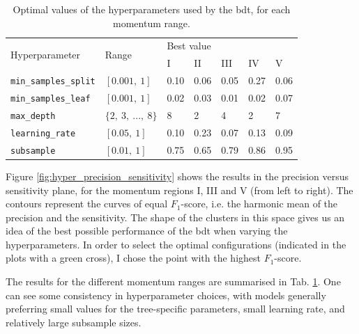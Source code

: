 \begin{table}[t]
	\caption{Optimal values of the hyperparameters used by the \gls{bdt}, for each momentum range.}
	\begin{center}
		\begin{small}
			\begin{tabular}{l|l|lllll}
				\multirow{2}{*}{Hyperparameter} & \multirow{2}{*}{Range} & \multicolumn{5}{l}{Best value}                           \\[1mm] \cline{3-7}
												&                        & \rule{0pt}{1.1\normalbaselineskip}I & II & III & IV & V \\[1mm]
												\hline
				\rule{0pt}{1.1\normalbaselineskip}\texttt{min_samples_split}      & $[0.001, ~1]$          & 0.10     & 0.06      & 0.05       & 0.27      & 0.06     \\[2mm]
				\texttt{min_samples_leaf}       & $[0.001, ~1]$          & 0.02     & 0.03      & 0.01       & 0.02      & 0.07     \\[2mm]
				\texttt{max_depth}              & $\{2, ~3, ~..., ~8\}$  & 8        & 2         & 4          & 2         & 7      \\[2mm]
				\texttt{learning_rate}          & $[0.05, ~1]$           & 0.10     & 0.23      & 0.07       & 0.13      & 0.09     \\[2mm]
				\texttt{subsample}              & $[0.01, ~1]$           & 0.75     & 0.65      & 0.79       & 0.86      & 0.95    
			\end{tabular}
		\end{small}
	\end{center}
	\label{tab:bdt_hyperpars}
\end{table}

Figure \ref{fig:hyper_precision_sensitivity} shows the results in the precision versus sensitivity plane, for the momentum regions I, III and V (from left to right). The contours represent the curves of equal $F_{1}$-score, i.e. the harmonic mean of the precision and the sensitivity. The shape of the clusters in this space gives us an idea of the best possible performance of the \gls{bdt} when varying the hyperparameters. In order to select the optimal configurations (indicated in the plots with a green cross), I chose the point with the highest $F_{1}$-score.

The results for the different momentum ranges are summarised in Tab. \ref{tab:bdt_hyperpars}. One can see some consistency in hyperparameter choices, with models generally preferring small values for the tree-specific parameters, small learning rate, and relatively large subsample sizes.


